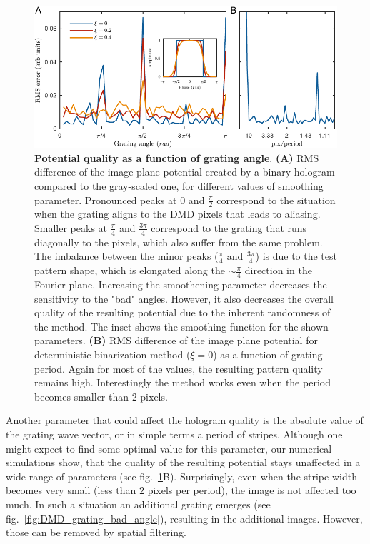 \begin{figure}[t]
	\centering
	\includegraphics[scale=1]{figures/DMD_K_rotation_v3.pdf}
	\caption{{\bf Potential quality as a function of grating angle}. {\bf (A)} RMS difference of the image plane potential created by a binary hologram compared to the gray-scaled one, for different values of smoothing parameter. Pronounced peaks at $0$ and $\frac{\pi}{2}$ correspond to the situation when the grating aligns to the DMD pixels that leads to aliasing. Smaller peaks at $\frac{\pi}{4}$ and $\frac{3\pi}{4}$ correspond to the grating that runs diagonally to the pixels, which also suffer from the same problem. The imbalance between the minor peaks ($\frac{\pi}{4}$ and $\frac{3\pi}{4}$) is due to the test pattern shape, which is elongated along the $\sim \frac{\pi}{4}$ direction in the Fourier plane. Increasing the smoothening parameter decreases the sensitivity to the "bad" angles. However, it also decreases the overall quality of the resulting potential due to the inherent randomness of the method. The inset shows the smoothing function for the shown parameters. {\bf (B)} RMS difference of the image plane potential for deterministic binarization method ($\xi = 0$) as a function of grating period. Again for most of the values, the resulting pattern quality remains high. Interestingly the method works even when the period becomes smaller than $2$ pixels.}
	\label{fig:DMD_K_rotation}
\end{figure}

Another parameter that could affect the hologram quality is the absolute value of the grating wave vector, or in simple terms a period of stripes. Although one might expect to find some optimal value for this parameter, our numerical simulations show, that the quality of the resulting potential stays unaffected in a wide range of parameters (see fig.~\ref{fig:DMD_K_rotation}B). Surprisingly, even when the stripe width becomes very small (less than $2$ pixels per period),  the image is not affected too much. In such a situation an additional grating emerges (see fig.~\ref{fig:DMD_grating_bad_angle}), resulting in the additional images. However, those can be removed by spatial filtering.

